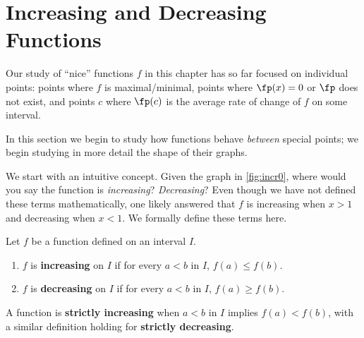 \section{Increasing and Decreasing Functions}\label{sec:incr_decr}

Our study of ``nice'' functions $f$ in this chapter has so far focused on individual points: points where $f$ is maximal/minimal, points where $\fp(x) = 0$ or $\fp$ does not exist, and points $c$ where $\fp(c)$ is the average rate of change of $f$ on some interval. 

In this section we begin to study how functions behave \emph{between} special points; we begin studying in more detail the shape of their graphs. 


We start with an intuitive concept. Given the graph in \autoref{fig:incr0}, where would you say the function is \emph{increasing}? \emph{Decreasing}? Even though we have not defined these terms mathematically, one likely answered that $f$ is increasing when $x>1$ and decreasing when $x<1$. We formally define these terms here.

\begin{definition}\label{def:incr_decr}
Let $f$ be a function defined on an interval $I$.
\begin{enumerate}
	\item	$f$ is \textbf{increasing} on $I$ if for every $a<b$ in $I$, $f(a) \leq f(b)$.
	\item	$f$ is \textbf{decreasing} on $I$ if for every $a<b$ in $I$, $f(a) \geq f(b)$.
\end{enumerate}
A function is \textbf{strictly increasing} when $a<b$ in $I$ implies $f(a) < f(b)$, with a similar definition holding for \textbf{strictly decreasing}.
\end{definition}

